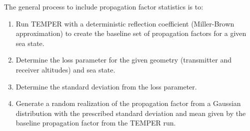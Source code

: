 The general process to include propagation factor statistics is to:
\begin{enumerate}
\item Run TEMPER with a deterministic reflection coefficient (Miller-Brown approximation) to create the baseline set of propagation factors for a given sea state.
\item Determine the loss parameter for the given geometry (transmitter and receiver altitudes) and sea state.
\item Determine the standard deviation from the loss parameter.
\item Generate a random realization of the propagation factor from a Gaussian distribution with the prescribed standard deviation and mean given by the baseline propagation factor from the TEMPER run.
\end{enumerate}